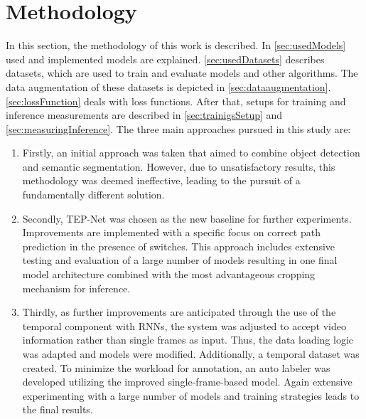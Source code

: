 \chapter{Methodology}
\label{sec:methodology}


In this section, the methodology of this work is described.
In \autoref{sec:usedModels} used and implemented models are explained.
\autoref{sec:usedDatasets} describes datasets, which are used to train and evaluate models and other algorithms.
The data augmentation of these datasets is depicted in \autoref{sec:dataaugmentation}.
\autoref{sec:lossFunction} deals with loss functions.
After that, setups for training and inference measurements are described in \autoref{sec:trainigsSetup} and \autoref{sec:measuringInference}.
The three main approaches pursued in this study are:


\begin{enumerate}
    \item Firstly, an initial approach was taken that aimed to combine object detection and semantic segmentation.
    However, due to unsatisfactory results, this methodology was deemed ineffective, leading to the pursuit of a fundamentally different solution.
    \item Secondly, \ac{TEP}-Net \cite{tepNet2024} was chosen as the new baseline for further experiments.
    Improvements are implemented with a specific focus on correct path prediction in the presence of switches. This approach includes extensive testing and evaluation of a large number of models resulting in one final model architecture combined with the most advantageous cropping mechanism for inference.
    \item Thirdly, as further improvements are anticipated through the use of the temporal component with \ac{RNN}s, the system was adjusted to accept video information rather than single frames as input.
    Thus, the data loading logic was adapted and models were modified.
    Additionally, a temporal dataset was created.
    To minimize the workload for annotation, an auto labeler was developed utilizing the improved single-frame-based model.
    Again extensive experimenting with a large number of models and training strategies leads to the final results.
\end{enumerate}

